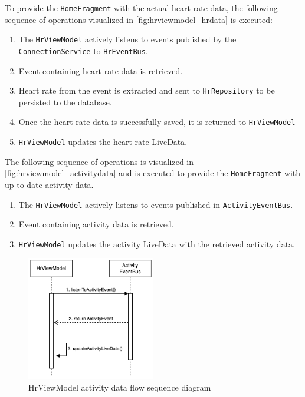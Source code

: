To provide the \texttt{HomeFragment} with the actual heart rate data, the following sequence of operations visualized in \autoref{fig:hrviewmodel_hrdata} is executed:
\begin{enumerate}
    \item The \texttt{HrViewModel} actively listens to events published by the \texttt{ConnectionService} to \texttt{HrEventBus}.
    \item Event containing heart rate data is retrieved.
    \item Heart rate from the event is extracted and sent to \texttt{HrRepository} to be persisted to the database.
    \item Once the heart rate data is successfully saved, it is returned to \texttt{HrViewModel}
    \item \texttt{HrViewModel} updates the heart rate LiveData.
\end{enumerate}

The following sequence of operations is visualized in \autoref{fig:hrviewmodel_activitydata} and is executed to provide the \texttt{HomeFragment} with up-to-date activity data.
\begin{enumerate}
    \item The \texttt{HrViewModel} actively listens to events published in \texttt{ActivityEventBus}.
    \item Event containing activity data is retrieved.
    \item \texttt{HrViewModel} updates the activity LiveData with the retrieved activity data.
\end{enumerate}

\begin{figure}[H]
    \centering
    \includegraphics[width=0.5\textwidth]{diagrams/hrviewmodel-activity.drawio.png}
    \caption{HrViewModel activity data flow sequence diagram}
    \label{fig:hrviewmodel_activitydata}
\end{figure}


